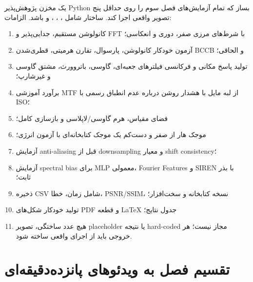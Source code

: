 \documentclass[12pt,openany,oneside]{book}
\begin{document}
\begin{workshopbox}
یک مخزن پژوهش‌پذیر Python بساز که تمام آزمایش‌های فصل سوم را روی حداقل پنج تصویر واقعی اجرا کند.
ساختار شامل ، ، ،  و  باشد. الزامات:
\begin{enumerate}
\item کانولوشن مستقیم، جدایی‌پذیر و FFT با شرط‌های مرزی صفر، دوری و انعکاسی؛
\item آزمون خودکار کانولوشن، پارسوال، تقارن هرمیتی، قطری‌شدن BCCB و الحاقی؛
\item تولید پاسخ مکانی و فرکانسی فیلترهای جعبه‌ای، گاوسی، باتروورث، مشتق گاوسی و غیرشارپ؛
\item برآورد آموزشی MTF از لبه مایل با هشدار روشن درباره عدم انطباق رسمی با ISO؛
\item فضای مقیاس، هرم گاوسی/لاپلاسی و بازسازی کامل؛
\item موجک هار از صفر و دست‌کم یک موجک کتابخانه‌ای با آزمون انرژی؛
\item آزمایش anti-aliasing قبل از downsampling و معیار shift consistency؛
\item آزمایش spectral bias برای MLP معمولی، Fourier Features و SIREN با بذر ثابت؛
\item ذخیره CSV شامل زمان، خطا، PSNR/SSIM، نسخه کتابخانه و سخت‌افزار؛
\item تولید خودکار شکل‌های PDF و قطعه LaTeX جدول نتایج؛
\item هیچ عدد ساختگی، تصویر placeholder یا نتیجه hard-coded مجاز نیست؛ هر خروجی باید از اجرای واقعی ساخته شود.
\end{enumerate}
\end{workshopbox}

\section{تقسیم فصل به ویدئوهای پانزده‌دقیقه‌ای}
\end{document}
